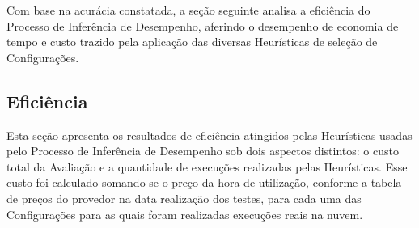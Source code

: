Com base na acurácia constatada, a seção seguinte analisa a eficiência do Processo
de Inferência de Desempenho, aferindo o desempenho de economia de tempo e custo
trazido pela aplicação das diversas Heurísticas de seleção de Configurações. 

\subsection{Eficiência}
\label{subsec:resultados_eficiencia}
Esta seção apresenta os resultados de eficiência atingidos pelas Heurísticas usadas 
pelo Processo de Inferência de Desempenho sob dois aspectos distintos: o custo 
total da Avaliação e a quantidade de execuções realizadas pelas Heurísticas. Esse 
custo foi calculado somando-se o preço da hora de utilização, conforme a tabela 
de preços do provedor na data realização dos testes, para cada uma das Configurações 
para as quais foram realizadas execuções reais na nuvem. 


